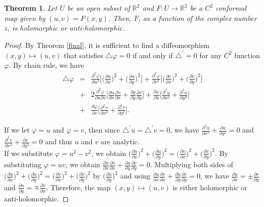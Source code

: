 \documentclass[a4paper,10pt]{amsart}
\theoremstyle{plain}
\newtheorem{thm}{Theorem}[section]
\newtheorem*{main theorem}{Theorem}
\theoremstyle{definition}
\begin{document}
\begin{thm}
Let $U$ be an open subset of $\mathbb{R}^2$ and $F : U \rightarrow
\mathbb{R}^2$ be a $C^2$ conformal map given by $(u,v) = F(x,y)$.
Then, $F$, as a function of the complex number $z$, is holomorphic
or anti-holomorphic.
\end{thm}

\begin{proof}
By Theorem \ref{final}, it is sufficient to find a diffeomorphism
$(x,y) \mapsto (u,v)$ that satisfies $\triangle \varphi = 0$ if
and only if $\triangle^\prime = 0$ for any $C^2$ function
$\varphi$. By chain rule, we have
\begin{eqnarray*}
\triangle \varphi &=& \frac{\partial^2 \varphi}{\partial u^2}
\Big[ \Big(\frac{\partial u}{\partial x}\Big)^2 +
\Big(\frac{\partial u}{\partial y}\Big)^2 \Big] + \frac{\partial^2
\varphi}{\partial v^2} \Big[ \Big(\frac{\partial v}{\partial
x}\Big)^2 + \Big(\frac{\partial v}{\partial y}\Big)^2 \Big]\\
&+& 2\frac{\partial^2 \varphi}{\partial u \partial v} \Big[
\frac{\partial u}{\partial x} \frac{\partial v}{\partial x} +
\frac{\partial y}{\partial y} \frac{\partial v}{\partial y} \Big]
+ \frac{\partial \varphi}{\partial u} \Big[ \frac{\partial ^2
u}{\partial x^2} + \frac{\partial^2 u}{\partial y^2} \Big] \\
&+& \frac{\partial \varphi}{\partial v} \Big[ \frac{\partial^2
v}{\partial x^2}+\frac{\partial^2 v}{\partial y^2} \Big].
\end{eqnarray*}

If we let $\varphi = u$ and $\varphi = v$, then since
$\triangle^\prime u = \triangle^\prime v =0$, we have
$\frac{\partial^2 u}{\partial x^2} + \frac{\partial u}{\partial
y^2} = 0$ and $\frac{\partial^2 v}{\partial x^2} + \frac{\partial
v}{\partial y^2} = 0$ and thus $u$ and $v$ are analytic. \\
If we substitute $\varphi = u^2 - v^2$, we obtain
$\Big(\frac{\partial u}{\partial x}\Big)^2 + \Big(\frac{\partial
u}{\partial y}\Big)^2 = \Big(\frac{\partial v}{\partial x}\Big)^2
+ \Big(\frac{\partial v}{\partial y}\Big)^2$. By substituting
$\varphi = uv$, we obtain $\frac{\partial u}{\partial
x}\frac{\partial v}{\partial x} + \frac{\partial u}{\partial
y}\frac{\partial v}{\partial y}=0$. Multiplying both sides of
$\Big(\frac{\partial u}{\partial x}\Big)^2 + \Big(\frac{\partial
u}{\partial y}\Big)^2 = \Big(\frac{\partial v}{\partial x}\Big)^2
+ \Big(\frac{\partial v}{\partial y}\Big)^2$ by
$\Big(\frac{\partial u}{\partial y}\Big)^2$ and using
$\frac{\partial u}{\partial x}\frac{\partial v}{\partial x} +
\frac{\partial u}{\partial y}\frac{\partial v}{\partial y}=0$, we
have $\frac{\partial u}{\partial x} = \pm \frac{\partial
v}{\partial y}$ and $\frac{\partial u}{\partial y} = \mp
\frac{\partial v}{\partial x}$. Therefore, the map $(x,y) \mapsto
(u,v)$ is either holomorphic or anti-holomorphic.

\end{proof}
\end{document}

